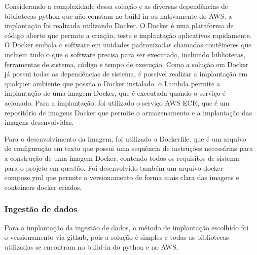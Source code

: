 Considerando a complexidade dessa solução e as diversas dependências de bibliotecas python que não constam no build-in ou nativamente do AWS, a implantação foi realizada utilizando Docker. O Docker é uma plataforma de código aberto que permite a criação, teste e implantação aplicativos rapidamente. O Docker embala o software em unidades padronizadas chamadas contêineres que incluem tudo o que o software precisa para ser executado, incluindo bibliotecas, ferramentas de sistema, código e tempo de execução. Como a solução em Docker já possui todas as dependências de sistema, é possível realizar a implantação em qualquer ambiente que possua o Docker instalado. o Lambda permite a implantação de uma imagem Docker, que é executada quando o serviço é acionado. Para a implantação, foi utilizado o serviço AWS ECR, que é um repositório de imagens Docker que permite o armazenamento e a implantação das imagens desenvolvidas.

Para o desenvolvimento da imagem, foi utilizado o Dockerfile, que é um arquivo de configuração em texto que possui uma sequência de instruções necessárias para a construção de uma imagem Docker, contendo todos os requisitos de sistema para o projeto em questão. Foi desenvolvido também um arquivo docker-compose.yml que permite o versionamento de forma mais clara das imagens e conteiners docker criados.

\subsubsection{Ingestão de dados}

Para a implantação da ingestão de dados, o método de implantação escolhido foi o versionamento via github, pois a solução é simples e todas as bibliotecas utilizadas se encontram no build-in do python e no AWS. 